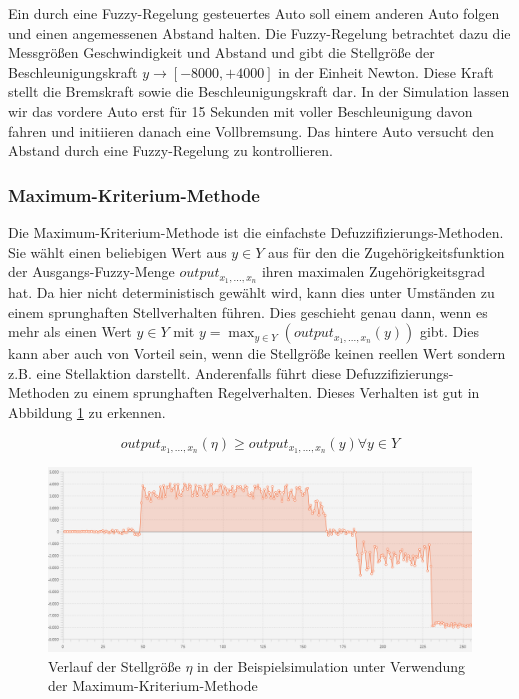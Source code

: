 \documentclass[12pt,a4paper,bibliography=totocnumbered,listof=totocnumbered, abstracton]{scrartcl}
\theoremstyle{Umgebung}
\begin{document}
\begin{bsp}
	Ein durch eine Fuzzy-Regelung gesteuertes Auto soll einem anderen Auto folgen und einen angemessenen Abstand halten. Die Fuzzy-Regelung betrachtet dazu die Messgrößen Geschwindigkeit und Abstand und gibt die Stellgröße der Beschleunigungskraft $y \rightarrow \left[-8000, +4000\right]$ in der Einheit Newton. Diese Kraft stellt die Bremskraft sowie die Beschleunigungskraft dar. In der Simulation lassen wir das vordere Auto erst für 15 Sekunden mit voller Beschleunigung davon fahren und initiieren danach eine Vollbremsung. Das hintere Auto versucht den Abstand durch eine Fuzzy-Regelung zu kontrollieren.
\end{bsp}

\subsubsection{Maximum-Kriterium-Methode}

Die Maximum-Kriterium-Methode ist die einfachste Defuzzifizierungs-Methoden. Sie wählt einen beliebigen Wert aus $y \in Y$ aus für den die Zugehörigkeitsfunktion der Ausgangs-Fuzzy-Menge $output_{x_1,..., x_n}$ ihren maximalen Zugehörigkeitsgrad hat. Da hier nicht deterministisch gewählt wird, kann dies unter Umständen zu einem sprunghaften Stellverhalten führen. Dies geschieht genau dann, wenn es mehr als einen Wert $y \in Y$ mit $y = \max_{y \in Y}(output_{x_1,..., x_n}(y))$ gibt. Dies kann aber auch von Vorteil sein, wenn die Stellgröße keinen reellen Wert sondern z.B. eine Stellaktion darstellt. Anderenfalls führt diese Defuzzifizierungs-Methoden zu einem sprunghaften Regelverhalten. Dieses Verhalten ist gut in Abbildung \ref{fig:max} zu erkennen. 

\begin{equation}
	output_{x_1,..., x_n}(\eta) \geq output_{x_1,..., x_n}(y) \forall y \in Y
\end{equation}

\begin{figure}
	\centering
	\includegraphics[width=0.8\linewidth]{img/defuzzy/max3}
	\caption{Verlauf der Stellgröße $\eta$ in der Beispielsimulation unter Verwendung der Maximum-Kriterium-Methode}
	\label{fig:max}
\end{figure}
\end{document}
